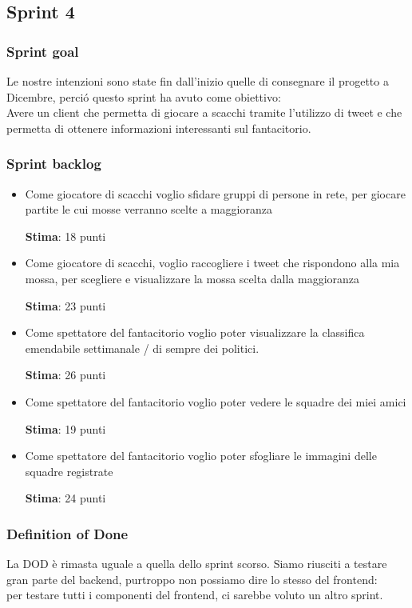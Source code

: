 \documentclass{article}
\begin{document}
\subsection{Sprint 4}
\subsubsection{Sprint goal}
Le nostre intenzioni sono state fin dall'inizio quelle di consegnare il progetto a Dicembre, perci\'o questo sprint ha avuto come obiettivo: \\
Avere un client che permetta di giocare a scacchi tramite l'utilizzo di tweet e che permetta di ottenere informazioni interessanti sul fantacitorio.
\subsubsection{Sprint backlog}
\begin{itemize}
    \item Come giocatore di scacchi voglio sfidare gruppi di persone in rete, per giocare partite le cui mosse verranno scelte a maggioranza

    \textbf{Stima}: 18 punti
    \item Come giocatore di scacchi, voglio raccogliere i tweet che rispondono alla mia mossa, per scegliere e visualizzare la mossa scelta dalla maggioranza

    \textbf{Stima}: 23 punti
    \item Come spettatore del fantacitorio voglio poter visualizzare la classifica emendabile settimanale / di sempre dei politici.

    \textbf{Stima}: 26 punti
    \item Come spettatore del fantacitorio voglio poter vedere le squadre dei miei amici

    \textbf{Stima}: 19 punti
    \item Come spettatore del fantacitorio voglio poter sfogliare le immagini delle squadre registrate

    \textbf{Stima}: 24 punti
\end{itemize}
\subsubsection{Definition of Done}
La DOD \`e rimasta uguale a quella dello sprint scorso.
Siamo riusciti a testare gran parte del backend, purtroppo non possiamo dire lo stesso del frontend: \\ per testare tutti i componenti del frontend, ci sarebbe voluto un altro sprint.
\end{document}
